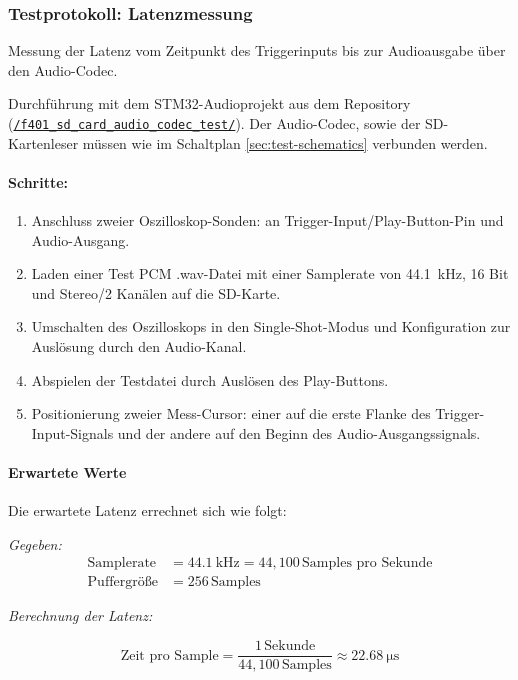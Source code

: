 \subsubsection{Testprotokoll: Latenzmessung}
\label{test-latenzmessung}

Messung der Latenz vom Zeitpunkt des Triggerinputs bis zur Audioausgabe über den Audio-Codec.

Durchführung mit dem STM32-Audioprojekt aus dem Repository (\href{run:../../f401_sd_card_audio_codec_test/}{\texttt{/f401\_sd\_card\_audio\_codec\_test/}}).
Der Audio-Codec, sowie der SD-Kartenleser müssen wie im Schaltplan \ref{sec:test-schematics} verbunden werden.

\paragraph{Schritte:}
\begin{enumerate}
	\item Anschluss zweier Oszilloskop-Sonden: an Trigger-Input/Play-Button-Pin und Audio-Ausgang.
	\item Laden einer Test PCM .wav-Datei mit einer Samplerate von \SI{44.1}{\kilo\hertz}, 16 Bit und Stereo/2 Kanälen auf die SD-Karte.
	\item Umschalten des Oszilloskops in den Single-Shot-Modus und Konfiguration zur Auslösung durch den Audio-Kanal.
	\item Abspielen der Testdatei durch Auslösen des Play-Buttons.
	\item Positionierung zweier Mess-Cursor: einer auf die erste Flanke des Trigger-Input-Signals und der andere auf den Beginn des Audio-Ausgangssignals.
\end{enumerate}
\paragraph{Erwartete Werte}
	Die erwartete Latenz errechnet sich wie folgt:
	
	\textit{Gegeben:}
	\begin{align*}
		\text{Samplerate} &= \SI{44.1}{\kilo\hertz} = 44{,}100 \, \text{Samples pro Sekunde} \\
		\text{Puffergröße} &= 256 \, \text{Samples}
	\end{align*}
	
	\textit{Berechnung der Latenz:}
	
	\[
	\text{Zeit pro Sample} = \frac{1 \, \text{Sekunde}}{44{,}100 \, \text{Samples}} \approx \SI{22.68}{\micro\second}
	\]
	
